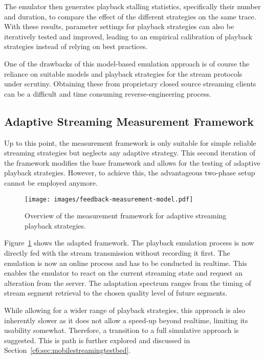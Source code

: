 The emulator then generates playback stalling statistics, specifically their number and duration, to compare the effect of the different strategies on the same trace. With these results, parameter settings for playback strategies can also be iteratively tested and improved, leading to an empirical calibration of playback strategies instead of relying on best practices.

One of the drawbacks of this model-based emulation approach is of course the reliance on suitable models and playback strategies for the stream protocols under scrutiny. Obtaining these from proprietary closed source streaming clients can be a difficult and time consuming reverse-engineering process.


\subsection{Adaptive Streaming Measurement Framework}

Up to this point, the measurement framework is only suitable for simple reliable streaming strategies but neglects any adaptive strategy. This second iteration of the framework modifies the base framework and allows for the testing of adaptive playback strategies. However, to achieve this, the advantageous two-phase setup cannot be employed anymore.

\begin{figure}[htb]
	\centering
	\texttt{[image: images/feedback-measurement-model.pdf]}
	\caption{Overview of the measurement framework for adaptive streaming playback strategies.}
\label{c3:fig:framework-feedback}
\end{figure}


Figure~\ref{c3:fig:framework-feedback} shows the adapted framework. The playback emulation process is now directly fed with the stream transmission without recording it first. The emulation is now an online process and has to be conducted in realtime. This enables the emulator to react on the current streaming state and request an alteration from the server. The adaptation spectrum ranges from the timing of stream segment retrieval to the chosen quality level of future segments. 

While allowing for a wider range of playback strategies, this approach is also inherently slower as it does not allow a speed-up beyond realtime, limiting its usability somewhat. 
Therefore, a transition to a full simulative approach is suggested. This is path is further explored and discussed in Section~\ref{c6:sec:mobilestreamingtestbed}.


